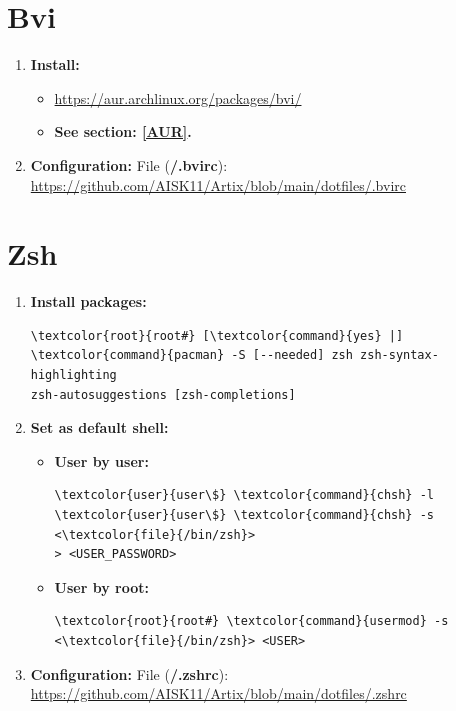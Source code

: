 \documentclass[10pt, a4paper, onecolumn, oneside, titlepage, openany]{book}
\begin{document}
\section{Bvi}
\begin{enumerate}
    \item \textbf{Install:}
    \begin{itemize}
        \item \url{https://aur.archlinux.org/packages/bvi/}
        \item \textbf{See section: \underline{\ref{AUR}}.}
    \end{itemize}
    \item \textbf{Configuration:}
\newline File (\textbf{\textcolor{file}{\texttildelow/.bvirc}}):
\newline \url{https://github.com/AISK11/Artix/blob/main/dotfiles/.bvirc}
\end{enumerate}

\section{Zsh}
\begin{enumerate}
    \item \textbf{Install packages:}
\begin{Verbatim}[commandchars=\\\{\}]
\textcolor{root}{root#} [\textcolor{command}{yes} |] \textcolor{command}{pacman} -S [--needed] zsh zsh-syntax-highlighting 
zsh-autosuggestions [zsh-completions]
\end{Verbatim}
    \item \textbf{Set as default shell:}
    \begin{itemize}
        \item \textbf{User by user:}
\begin{Verbatim}[commandchars=\\\{\}]
\textcolor{user}{user\$} \textcolor{command}{chsh} -l
\textcolor{user}{user\$} \textcolor{command}{chsh} -s <\textcolor{file}{/bin/zsh}>
> <USER_PASSWORD>
\end{Verbatim}        
        \item \textbf{User by root:}
\begin{Verbatim}[commandchars=\\\{\}]
\textcolor{root}{root#} \textcolor{command}{usermod} -s <\textcolor{file}{/bin/zsh}> <USER>
\end{Verbatim}
    \end{itemize}
    \item \textbf{Configuration:}
\newline File (\textbf{\textcolor{file}{\texttildelow/.zshrc}}):
\newline \url{https://github.com/AISK11/Artix/blob/main/dotfiles/.zshrc}
\end{enumerate}
\end{document}
